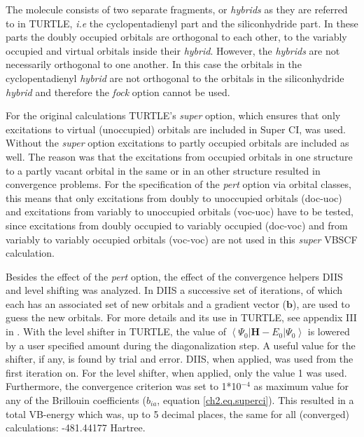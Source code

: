 The molecule consists of two separate fragments, or \textit{hybrids} as they are referred to in TURTLE, \textit{i.e} the cyclopentadienyl part and the siliconhydride part. In these parts the doubly occupied orbitals are orthogonal to each other, to the variably occupied and virtual orbitals inside their \textit{hybrid}. However, the \textit{hybrids} are not necessarily orthogonal to one another. In this case the orbitals in the cyclopentadienyl \textit{hybrid} are not orthogonal to the orbitals in the siliconhydride \textit{hybrid} and therefore the \textit{fock} option cannot be used.

For the original calculations TURTLE's \textit{super} option, which ensures that only excitations to virtual (unoccupied) orbitals are included in Super CI, was used. Without the \textit{super} option excitations to partly occupied orbitals are included as well. The reason was that the excitations from occupied orbitals in one structure to a partly vacant orbital in the same or in an other structure resulted in convergence problems. For the specification of the \textit{pert} option via orbital classes, this means that only excitations from doubly to unoccupied orbitals \mbox{(doc-uoc)} and excitations from variably to unoccupied orbitals \mbox{(voc-uoc)} have to be tested, since excitations from doubly occupied to variably occupied \mbox{(doc-voc)} and from variably to variably occupied orbitals \mbox{(voc-voc)} are not used in this \textit{super} VBSCF calculation.

Besides the effect of the \textit{pert} option, the effect of the convergence helpers DIIS \cite{diis1,diis2} and level shifting \cite{level1,level2} was analyzed. In DIIS a successive set of iterations, of which each has an associated set of new orbitals and a gradient vector ($\mathbf{b}$), are used to guess the new orbitals. For more details and its use in TURTLE, see appendix III in \cite{koos1}. With the level shifter in TURTLE, the value of $\left < \Psi_0 | \mathbf{H} - E_0 | \Psi_0 \right >$ is lowered by a user specified amount during the diagonalization step. A useful value for the shifter, if any, is found by trial and error. DIIS, when applied, was used from the first iteration on. For the level shifter, when applied, only the value 1 was used. Furthermore, the convergence criterion was set to 1*10$^{-4}$ as maximum value for any of the Brillouin coefficients ($b_{ia}$, equation \ref{ch2.eq.superci}). This resulted in a total VB-energy which was, up to 5 decimal places, the same for all (converged) calculations: -481.44177 Hartree.

